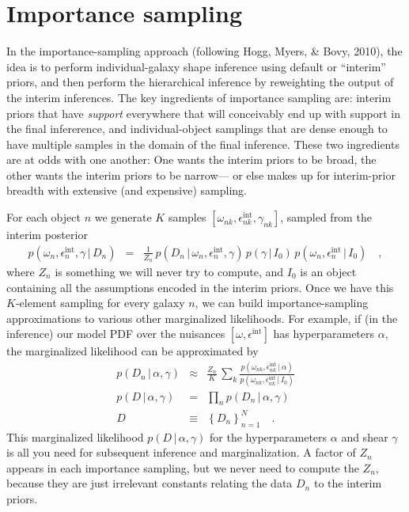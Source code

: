 \documentclass[12pt]{article}
\newcommand{\given}{\,|\,}
\newcommand{\data}{D}
\newcommand{\shear}{\gamma}
\newcommand{\ellip}{\epsilon}
\newcommand{\intrinsic}{\ellip^{\mathrm{int}}}
\newcommand{\prior}{I}
\newcommand{\nspars}{\omega}
\newcommand{\hyperpars}{\alpha}
\newcommand{\setof}[1]{\left\{{#1}\right\}}
\begin{document}
\section{Importance sampling}

In the importance-sampling approach (following Hogg, Myers, \& Bovy, 2010),
  the idea is to perform individual-galaxy shape inference using default or ``interim'' priors,
  and then perform the hierarchical inference by reweighting the output of the interim inferences.
The key ingredients of importance sampling are:
  interim priors that have \emph{support} everywhere that will conceivably end up with support in the final infererence,
  and individual-object samplings that are dense enough to have multiple samples in the domain of the final inference.
These two ingredients are at odds with one another:
One wants the interim priors to be broad,
  the other wants the interim priors to be narrow---%
  or else makes up for interim-prior breadth with extensive (and expensive) sampling.

For each object $n$ we generate $K$ samples $[\nspars_{nk},\intrinsic_{nk},\shear_{nk}]$,
   sampled from the interim posterior
\begin{eqnarray}
p(\nspars_n,\intrinsic_n,\shear\given\data_n)
  &=& \frac{1}{Z_n}\,p(\data_n\given\nspars_n,\intrinsic_n,\shear)\,p(\shear\given\prior_0)\,p(\nspars_n,\intrinsic_n\given\prior_0)
  \quad ,
\end{eqnarray}
  where $Z_n$ is something we will never try to compute,
  and $\prior_0$ is an object containing all the assumptions encoded in the interim priors.
Once we have this $K$-element sampling for every galaxy $n$,
  we can build importance-sampling approximations to various other marginalized likelihoods.
For example, if (in the inference) our model PDF over the nuisances $[\nspars,\intrinsic]$ has hyperparameters $\hyperpars$,
  the marginalized likelihood can be approximated by
\begin{eqnarray}
p(\data_n\given\hyperpars,\shear)
  &\approx& \frac{Z_n}{K}\,\sum_k \frac{p(\nspars_{nk},\intrinsic_{nk}\given\hyperpars)}{p(\nspars_{nk},\intrinsic_{nk}\given\prior_0)}
  \\
p(\data\given\hyperpars,\shear)
  &=& \prod_n p(\data_n\given\hyperpars,\shear)
  \\
\data
  &\equiv& \setof{\data_n}_{n=1}^N
  \quad .
\end{eqnarray}
This marginalized likelihood $p(\data\given\hyperpars,\shear)$ for the hyperparameters $\alpha$ and shear $\shear$
  is all you need for subsequent inference and marginalization.
A factor of $Z_n$ appears in each importance sampling,
  but we never need to compute the $Z_n$, because they are just irrelevant constants
  relating the data $D_n$ to the interim priors.
\end{document}
